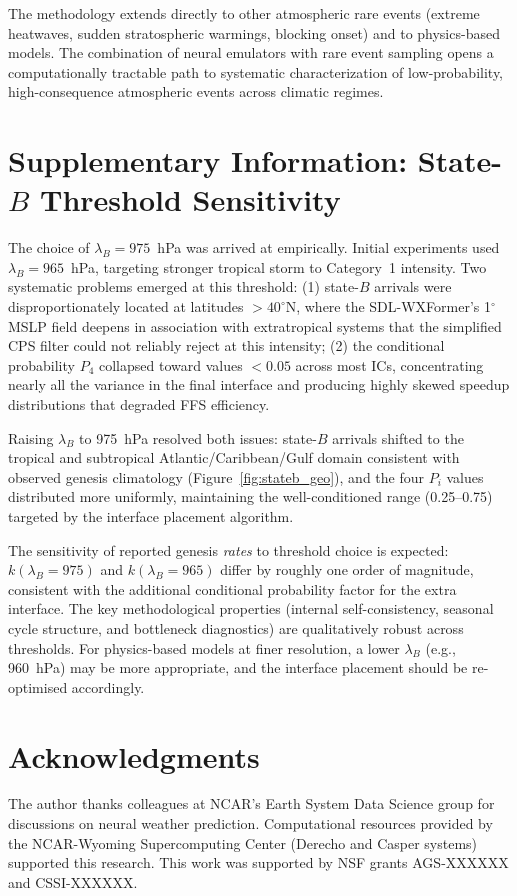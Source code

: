 \documentclass[11pt]{article}
\begin{document}
The methodology extends directly to other atmospheric rare events (extreme heatwaves,
sudden stratospheric warmings, blocking onset) and to physics-based models. The
combination of neural emulators with rare event sampling opens a computationally
tractable path to systematic characterization of low-probability, high-consequence
atmospheric events across climatic regimes.

\appendix
\section{Supplementary Information: State-$B$ Threshold Sensitivity}
\label{sec:si_threshold}

The choice of $\lambda_B = 975$~hPa was arrived at empirically.
Initial experiments used $\lambda_B = 965$~hPa, targeting stronger tropical storm
to Category~1 intensity. Two systematic problems emerged at this threshold:
(1) state-$B$ arrivals were disproportionately located at latitudes $>40^\circ$N,
where the SDL-WXFormer's 1$^\circ$ MSLP field deepens in association with
extratropical systems that the simplified CPS filter could not reliably reject
at this intensity; (2) the conditional probability $P_4$ collapsed toward values
$<0.05$ across most ICs, concentrating nearly all the variance in the final interface
and producing highly skewed speedup distributions that degraded FFS efficiency.

Raising $\lambda_B$ to 975~hPa resolved both issues: state-$B$ arrivals shifted to
the tropical and subtropical Atlantic/Caribbean/Gulf domain consistent with observed
genesis climatology (Figure~\ref{fig:stateb_geo}), and the four $P_i$ values
distributed more uniformly, maintaining the well-conditioned range (0.25--0.75)
targeted by the interface placement algorithm.

The sensitivity of reported genesis \textit{rates} to threshold choice is expected:
$k(\lambda_B = 975)$ and $k(\lambda_B = 965)$ differ by roughly one order of magnitude,
consistent with the additional conditional probability factor for the extra interface.
The key methodological properties (internal self-consistency, seasonal cycle
structure, and bottleneck diagnostics) are qualitatively robust across thresholds.
For physics-based models at finer resolution, a lower $\lambda_B$ (e.g., 960~hPa)
may be more appropriate, and the interface placement should be re-optimised accordingly.

\section*{Acknowledgments}
The author thanks colleagues at NCAR's Earth System Data Science group for discussions
on neural weather prediction. Computational resources provided by the
NCAR-Wyoming Supercomputing Center (Derecho and Casper systems) supported this research.
This work was supported by NSF grants AGS-XXXXXX and CSSI-XXXXXX.
\end{document}
